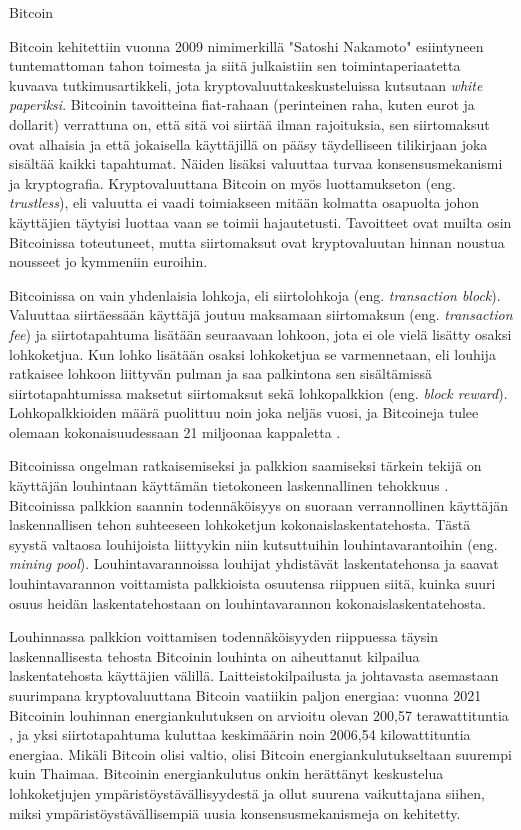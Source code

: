 \begin{subsection}{Bitcoin\label{bitcoin}}

Bitcoin kehitettiin vuonna 2009 nimimerkillä "Satoshi Nakamoto" esiintyneen tuntemattoman tahon toimesta ja siitä julkaistiin sen toimintaperiaatetta \cite{bitcoin1, satoshibitcoin} kuvaava tutkimusartikkeli, jota kryptovaluuttakeskusteluissa kutsutaan \textit{white paperiksi}. Bitcoinin tavoitteina fiat-rahaan (perinteinen raha, kuten eurot ja dollarit) verrattuna on, että sitä voi siirtää ilman rajoituksia, sen siirtomaksut ovat alhaisia ja että jokaisella käyttäjillä on pääsy täydelliseen tilikirjaan joka sisältää kaikki tapahtumat. Näiden lisäksi valuuttaa turvaa konsensusmekanismi ja kryptografia. Kryptovaluuttana Bitcoin on myös luottamukseton (eng. \textit{trustless}), eli valuutta ei vaadi toimiakseen mitään kolmatta osapuolta johon käyttäjien täytyisi luottaa vaan se toimii hajautetusti. Tavoitteet ovat muilta osin Bitcoinissa toteutuneet, mutta siirtomaksut ovat kryptovaluutan hinnan noustua nousseet jo kymmeniin euroihin.

Bitcoinissa on vain yhdenlaisia lohkoja, eli siirtolohkoja (eng. \textit{transaction block}). Valuuttaa siirtäessään käyttäjä joutuu maksamaan siirtomaksun (eng. \textit{transaction fee}) ja siirtotapahtuma lisätään seuraavaan lohkoon, jota ei ole vielä lisätty osaksi lohkoketjua. Kun lohko lisätään osaksi lohkoketjua se varmennetaan, eli louhija ratkaisee lohkoon liittyvän pulman ja saa palkintona sen sisältämissä siirtotapahtumissa maksetut siirtomaksut sekä lohkopalkkion (eng. \textit{block reward}). Lohkopalkkioiden määrä puolittuu noin joka neljäs vuosi, ja Bitcoineja tulee olemaan kokonaisuudessaan 21 miljoonaa kappaletta \cite{satoshibitcoin}.

Bitcoinissa ongelman ratkaisemiseksi ja palkkion saamiseksi tärkein tekijä on käyttäjän louhintaan käyttämän tietokoneen laskennallinen tehokkuus \cite{bitcoin1}. Bitcoinissa palkkion saannin todennäköisyys on suoraan verrannollinen käyttäjän laskennallisen tehon suhteeseen lohkoketjun kokonaislaskentatehosta. Tästä syystä valtaosa louhijoista liittyykin niin kutsuttuihin louhintavarantoihin (eng. \textit{mining pool}). Louhintavarannoissa louhijat yhdistävät laskentatehonsa ja saavat louhintavarannon voittamista palkkioista osuutensa riippuen siitä, kuinka suuri osuus heidän laskentatehostaan on louhintavarannon kokonaislaskentatehosta.

Louhinnassa palkkion voittamisen todennäköisyyden riippuessa täysin laskennallisesta tehosta Bitcoinin louhinta on aiheuttanut kilpailua laskentatehosta käyttäjien välillä. Laitteistokilpailusta ja johtavasta asemastaan suurimpana kryptovaluuttana Bitcoin vaatiikin paljon energiaa: vuonna 2021 Bitcoinin louhinnan energiankulutuksen on arvioitu olevan 200,57 terawattituntia \cite{bitcoinenergy}, ja yksi siirtotapahtuma kuluttaa keskimäärin noin 2006,54 kilowattituntia energiaa. Mikäli Bitcoin olisi valtio, olisi Bitcoin energiankulutukseltaan suurempi kuin Thaimaa. Bitcoinin energiankulutus onkin herättänyt keskustelua lohkoketjujen ympäristöystävällisyydestä ja ollut suurena vaikuttajana siihen, miksi ympäristöystävällisempiä uusia konsensusmekanismeja on kehitetty.


\end{subsection}
